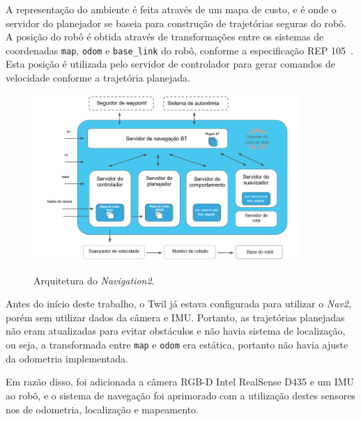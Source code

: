 \documentclass[repeatfields,xlists,xpacks,oneside,yearsonly]{ufrgscca}
\begin{document}
A representação do ambiente é feita através de um mapa de custo, e é onde o servidor do planejador
se baseia para construção de trajetórias seguras do robô.
A posição do robô é obtida através de transformações entre os sistemas de coordenadas \texttt{map},
\texttt{odom} e \texttt{base\_link} do robô, conforme a especificação REP 105~\cite{rep_105}.
Esta posição é utilizada pelo servidor de controlador para gerar comandos de velocidade conforme
a trajetória planejada.

\begin{figure}[h]
    {
        \centering
        \caption{Arquitetura do \textit{Navigation2}.}
        \label{fig:nav2_arc}
        \includegraphics[width=0.9\textwidth]{nav2_architecture_trad.png}\\
    }
    {} %
\end{figure}

Antes do início deste trabalho, o Twil já estava configurada para utilizar o \textit{Nav2},
porém sem utilizar dados da câmera e IMU.
Portanto, as trajetórias planejadas não eram atualizadas
para evitar obstáculos e não havia sistema de localização, ou seja,
a transformada entre \texttt{map} e \texttt{odom} era estática, portanto
não havia ajuste da odometria implementada.

Em razão disso, foi adicionada a câmera RGB-D Intel RealSense D435 e um IMU ao robô,
e o sistema de navegação foi aprimorado com a utilização destes sensores nos
de odometria, localização e mapeamento.

\end{document}

